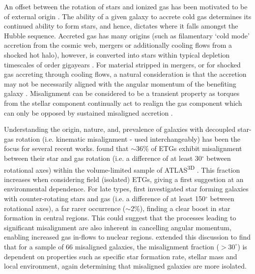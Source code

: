 An offset between the rotation of stars and ionized gas has been motivated to be of external origin \citep[see;][]{sarzi2006,davis2011}. The ability of a given galaxy to accrete cold gas determines its continued ability to form stars, and hence, dictates where it falls amongst the Hubble sequence. Accreted gas has many origins (such as filamentary `cold mode' accretion from the cosmic web, mergers or additionally cooling flows from a shocked hot halo), however, is converted into stars within typical depletion timescales of order gigayears \citep{davis2016}. 
For material stripped in mergers, or for shocked gas accreting through cooling flows, a natural consideration is that the accretion may not be necessarily aligned with the angular momentum of the benefiting galaxy \citep[e.g.][]{davis2011, lagos2015}. Misalignment can be considered to be a transient property as torques from the stellar component continually act to realign the gas component which can only be opposed by sustained misaligned accretion \citep[][]{vdvoort2015, davis2016}. 

Understanding the origin, nature, and, prevalence of galaxies with decoupled star-gas rotation (i.e. kinematic misalignment - used interchangeably) has been the focus for several recent works. \citet{davis2011} found that $\sim 36$\% of ETGs exhibit misalignment between their star and gas rotation (i.e. a difference of at least 30$^{\circ}$ between rotational axes) within the volume-limited sample of ATLAS\textsuperscript{3D} \citep{atlas3d}. This fraction increases when considering field (isolated) ETGs, giving a first suggestion at an environmental dependence. For late types, \citet{chen2016} first investigated star forming galaxies with counter-rotating stars and gas (i.e. a difference of at least 150$^{\circ}$ between rotational axes), a far rarer occurrence ($\sim$2\%), finding a clear boost in star formation in central regions. This could suggest that the processes leading to significant misalignment are also inherent in cancelling angular momentum, enabling increased gas in-flows to nuclear regions. \citet{jin2016} extended this discussion to find that for a sample of 66 misaligned galaxies, the misalignment fraction ($> 30^{\circ}$) is dependent on properties such as specific star formation rate, stellar mass and local environment, again determining that misaligned galaxies are more isolated. 

